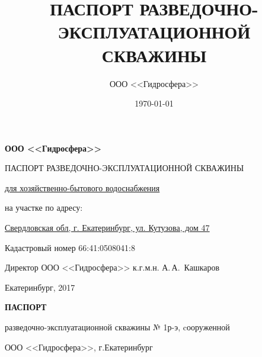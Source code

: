 \documentclass[a4paper,12pt]{article} %
\author{ООО <<Гидросфера>>}\label{company}
\title{ПАСПОРТ РАЗВЕДОЧНО-ЭКСПЛУАТАЦИОННОЙ СКВАЖИНЫ}
\date{\today}
\newcommand{\txtExecutor}{ООО <<Гидросфера>>}			%
\newcommand{\txtYear}{2017}			%
\newcommand{\txtNumber}{№ 1р-э}  					%
\newcommand{\txtAddress}{Свердловская обл, г. Екатеринбург, ул. Кутузова, дом 47}
\newcommand{\txtCadaster}{66:41:0508041:8} 			%
\begin{document}


\begin{titlepage}
	\begin{center}
		\textbf{\txtExecutor}
		\vspace{5.5cm}
		
		{\LARGE ПАСПОРТ РАЗВЕДОЧНО-ЭКСПЛУАТАЦИОННОЙ СКВАЖИНЫ}
		\vspace{0.25cm}
		
		\underline{для хозяйственно-бытового водоснабжения}
		
		\bigskip
		
		на участке по адресу:
				
		\underline{\txtAddress}
		
		\bigskip
		Кадастровый номер \txtCadaster
		
		\vfill
	
		\bigskip
		
	\end{center}

	\vfill
	
	\newlength{\ML}
	\hfill
	\begin{minipage}{1.0\textwidth}
		Директор ООО <<Гидросфера>> к.г.м.н.
		\underline{\hspace{\ML}} А.\,А.~Кашкаров\\
	\end{minipage}%
	
	\bigskip
	
	\vfill
	\begin{center}
		Екатеринбург, \txtYear
	\end{center}			

	\end{titlepage}


	\begin{center}
		\textbf{ПАСПОРТ}

		разведочно-эксплуатационной скважины \txtNumber, cооруженной 

		\txtExecutor, г.Екатеринбург

	\end{center}
\end{document}
